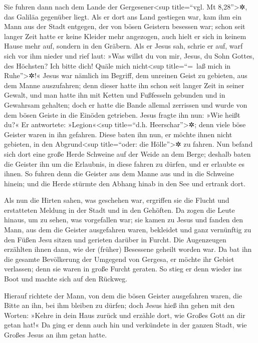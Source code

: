  Sie fuhren dann nach dem Lande der
Gergesener\textless sup title=``vgl. Mt 8,28''\textgreater✲, das Galiläa
gegenüber liegt.  Als er dort ans Land gestiegen war, kam
ihm ein Mann aus der Stadt entgegen, der von bösen Geistern besessen
war; schon seit langer Zeit hatte er keine Kleider mehr angezogen, auch
hielt er sich in keinem Hause mehr auf, sondern in den Gräbern.
 Als er Jesus sah, schrie er auf, warf sich vor ihm
nieder und rief laut: »Was willst du von mir, Jesus, du Sohn Gottes, des
Höchsten? Ich bitte dich! Quäle mich nicht\textless sup title=``=~laß
mich in Ruhe''\textgreater✲!«  Jesus war nämlich im
Begriff, dem unreinen Geist zu gebieten, aus dem Manne auszufahren; denn
dieser hatte ihn schon seit langer Zeit in seiner Gewalt, und man hatte
ihn mit Ketten und Fußfesseln gebunden und in Gewahrsam gehalten; doch
er hatte die Bande allemal zerrissen und wurde von dem bösen Geiste in
die Einöden getrieben.  Jesus fragte ihn nun: »Wie heißt
du?« Er antwortete: »Legion«\textless sup title=``d.h.
Heerschar''\textgreater✲; denn viele böse Geister waren in ihn gefahren.
 Diese baten ihn nun, er möchte ihnen nicht gebieten, in
den Abgrund\textless sup title=``oder: die Hölle''\textgreater✲ zu
fahren.  Nun befand sich dort eine große Herde Schweine
auf der Weide an dem Berge; deshalb baten die Geister ihn um die
Erlaubnis, in diese fahren zu dürfen, und er erlaubte es ihnen.
 So fuhren denn die Geister aus dem Manne aus und in die
Schweine hinein; und die Herde stürmte den Abhang hinab in den See und
ertrank dort.

 Als nun die Hirten sahen, was geschehen war, ergriffen
sie die Flucht und erstatteten Meldung in der Stadt und in den Gehöften.
 Da zogen die Leute hinaus, um zu sehen, was vorgefallen
war; sie kamen zu Jesus und fanden den Mann, aus dem die Geister
ausgefahren waren, bekleidet und ganz vernünftig zu den Füßen Jesu
sitzen und gerieten darüber in Furcht.  Die Augenzeugen
erzählten ihnen dann, wie der (früher) Besessene geheilt worden war.
 Da bat ihn die gesamte Bevölkerung der Umgegend von
Gergesa, er möchte ihr Gebiet verlassen; denn sie waren in große Furcht
geraten. So stieg er denn wieder ins Boot und machte sich auf den
Rückweg.

 Hierauf richtete der Mann, von dem die bösen Geister
ausgefahren waren, die Bitte an ihn, bei ihm bleiben zu dürfen; doch
Jesus hieß ihn gehen mit den Worten:  »Kehre in dein Haus
zurück und erzähle dort, wie Großes Gott an dir getan hat!« Da ging er
denn auch hin und verkündete in der ganzen Stadt, wie Großes Jesus an
ihm getan hatte.

